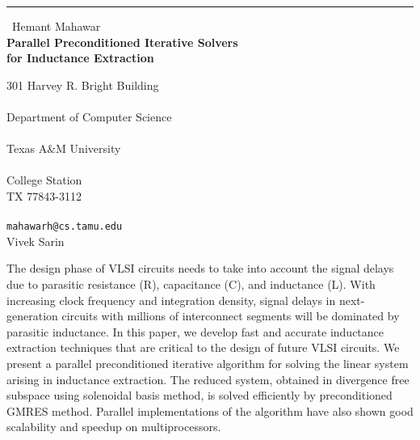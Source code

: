 \documentclass{report}
\begin{document}
\begin{center}
\rule{6in}{1pt} \
{\large Hemant Mahawar \\
{\bf Parallel Preconditioned Iterative Solvers\\ for Inductance Extraction}}

301 Harvey R. Bright Building \\ \\ Department of Computer Science \\ \\ Texas A\&M University \\ \\ College Station \\ TX 77843-3112\\
\\
{\tt mahawarh@cs.tamu.edu}\\
Vivek Sarin\end{center}

The design phase of VLSI circuits needs to take into account the signal
delays due to parasitic resistance (R), capacitance (C), and inductance
(L). With increasing clock frequency and integration density, signal
delays in next-generation circuits with millions of interconnect segments
will be dominated by parasitic inductance. In this paper, we develop fast
and accurate inductance extraction techniques that are critical to the
design of future VLSI circuits. We present a parallel preconditioned
iterative algorithm for solving the linear system arising in inductance
extraction. The reduced system, obtained in divergence free subspace
using solenoidal basis method, is solved efficiently by preconditioned
GMRES method. Parallel implementations of the algorithm have also shown
good scalability and speedup on multiprocessors.
\end{document}
